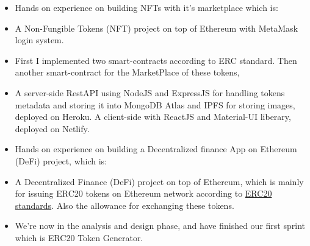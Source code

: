 \documentclass[10pt,a4paper]{altacv}
\begin{document}
\begin{itemize}
\item Hands on experience on building NFTs with it's marketplace which is:
\end{itemize}

\newpage


\begin{mdframed}

\begin{itemize}
  \item A Non-Fungible Tokens (NFT) project on top of Ethereum with MetaMask login system. 
  \item First I implemented two smart-contracts according to ERC standard. Then another smart-contract for the MarketPlace of these tokens,
  \item A server-side RestAPI using NodeJS and ExpressJS for handling tokens metadata and storing it into MongoDB Atlas and IPFS for storing images, deployed on Heroku. A client-side with ReactJS and Material-UI liberary, deployed on Netlify.
\end{itemize}
\begin{itemize}
   
\end{itemize}
\begin{itemize}
\end{itemize}
\end{mdframed}

\begin{itemize}
\item Hands on experience on building a Decentralized finance App on Ethereum (DeFi) project, which is:
\end{itemize}

\begin{mdframed}
\begin{itemize}
  \item A Decentralized Finance (DeFi) project on top of Ethereum, which is mainly for issuing ERC20 tokens on Ethereum network according to \href{https://github.com/ethereum/eips/issues/20}{ERC20 standards}. Also the allowance for exchanging these tokens.
  \item We're now in the analysis and design phase, and have finished our first sprint which is ERC20 Token Generator. 
\end{itemize}

\\
\end{mdframed}
\end{document}
